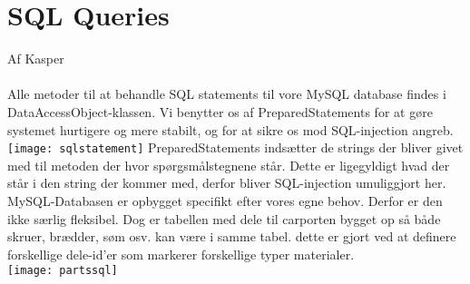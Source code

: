 \section{SQL Queries}
Af Kasper\\\\
Alle metoder til at behandle SQL statements til vore MySQL database findes i DataAccessObject-klassen. Vi benytter os af PreparedStatements for at gøre systemet hurtigere og mere stabilt, og for at sikre os mod SQL-injection angreb.\\
\texttt{[image: sqlstatement]}
PreparedStatements indsætter de strings der bliver givet med til metoden der hvor spørgsmålstegnene står. Dette er ligegyldigt hvad der står i den string der kommer med, derfor bliver SQL-injection umuliggjort her.\\
MySQL-Databasen er opbygget specifikt efter vores egne behov. Derfor er den ikke særlig fleksibel. Dog er tabellen med dele til carporten bygget op så både skruer, brædder, søm osv. kan være i samme tabel. dette er gjort ved at definere forskellige dele-id'er som markerer forskellige typer materialer.\\
\texttt{[image: partssql]}